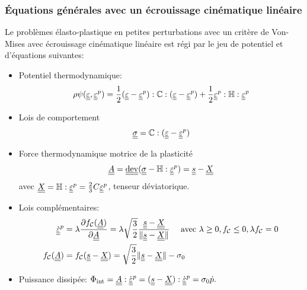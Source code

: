 \documentclass[10pt]{book}
\newcommand{\FthEpsp}{\ten{A}}
\begin{document}
\begin{appendices}
\subsubsection{Équations générales avec un écrouissage cinématique linéaire}
Le problèmes élasto-plastique en petites perturbations avec un critère de Von-Mises avec écrouissage cinématique linéaire est régi par le jeu de potentiel et d'équations suivantes:
\begin{itemize}
\item Potentiel thermodynamique:
$$\rho \psi(\underline{\underline{\varepsilon}},\underline{\underline{\varepsilon}}^p)=\frac{1}{2}(\underline{\underline{\varepsilon}}-\underline{\underline{\varepsilon}}^p):\mathbb{C}:(\underline{\underline{\varepsilon}}-\underline{\underline{\varepsilon}}^p)+\frac{1}{2}\underline{\underline{\varepsilon}}^p:\mathbb{H}:\underline{\underline{\varepsilon}}^p$$
\item Lois de comportement
$$\underline{\underline{\sigma}} =\mathbb{C}:(\underline{\underline{\varepsilon}}-\underline{\underline{\varepsilon}}^p)$$
\item Force thermodynamique motrice de la plasticité
$$\FthEpsp=\dev(\SC-\TenEcroui:\EpsP)=\devia-\TenTranslatDom$$
avec $\underline{\underline{X}}=\mathbb{H}:\underline{\underline{\varepsilon}}^p=\frac{2}{3}C\underline{\underline{\varepsilon}}^p$, tenseur déviatorique.
\item Lois complémentaires:
$$\begin{aligned}
\dot{\DefoHPP}^{p}&=\lambda\frac{\partial \FChargeConvexe(\FthEpsp)}{\partial \FthEpsp}=\lambda\sqrt{\frac{3}{2}}\frac{\devia-\TenTranslatDom}{\Vert \devia-\TenTranslatDom\Vert} \quad \avec \lambda\geq 0, \FChargeConvexe\leq 0, \lambda\FChargeConvexe=0\\
\FChargeConvexe(\FthEpsp)&=\FChargeConvexe(\devia-\TenTranslatDom)=\sqrt{\frac{3}{2}}\Vert \devia-\TenTranslatDom\Vert-\sigma_{0}
\end{aligned}$$
\item Puissance dissipée: $\dint=\FthEpsp:\dot{\DefoHPP}^{p}=(\devia-\TenTranslatDom):\dot{\DefoHPP}^{p}= \sigma_{0}\dot{p}.$
\end{itemize}

\end{appendices}
\end{document}

